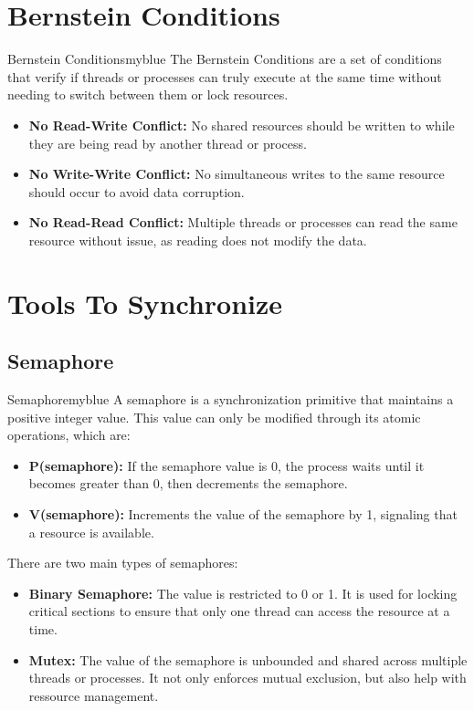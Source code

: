 \section{Bernstein Conditions}
\begin{prettyBox}{Bernstein Conditions}{myblue}
The Bernstein Conditions are a set of conditions that verify if threads or processes
can truly execute at the same time without needing to switch between them or lock resources.

\begin{itemize}
    \item \textbf{No Read-Write Conflict:} No shared resources should be written to while they are being read by another thread or process.
    \item \textbf{No Write-Write Conflict:} No simultaneous writes to the same resource should occur to avoid data corruption.
    \item \textbf{No Read-Read Conflict:} Multiple threads or processes can read the same resource without issue, as reading does not modify the data.
\end{itemize}
\end{prettyBox}


\vspace{0.35cm}
\section{Tools To Synchronize}

\subsection{Semaphore}


\begin{prettyBox}{Semaphore}{myblue}
A semaphore is a synchronization primitive that maintains a positive integer value. This value can only be modified through its atomic operations, which are:

\begin{itemize}
    \item \textbf{P(semaphore):} If the semaphore value is 0, the process waits until it becomes greater than 0, then decrements the semaphore.
    \item \textbf{V(semaphore):} Increments the value of the semaphore by 1, signaling that a resource is available.
\end{itemize}

There are two main types of semaphores:
\begin{itemize}
    \item \textbf{Binary Semaphore:} The value is restricted to 0 or 1. It is used for locking critical sections to ensure that only one thread can access the resource at a time.
    \item \textbf{Mutex:} The value of the semaphore is unbounded and shared across multiple threads or processes. It not only enforces mutual exclusion, but also help with ressource management.
\end{itemize}
\end{prettyBox}

